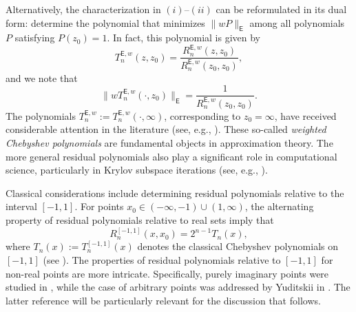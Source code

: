 \documentclass[12pt,oneside,reqno]{amsart}
\theoremstyle{definition}
\numberwithin{equation}{section}
\newcommand{\E}{{\mathsf E}}
\newcommand{\cP}{{\mathcal{P}}}
\begin{document}
Alternatively, the characterization in $(i)$--$(ii)$ can be reformulated in its dual form: determine the polynomial that minimizes $\|wP\|_{\E}$ among all polynomials $P$ satisfying $P(z_0) = 1$.
In fact, this polynomial is given by
\begin{equation}
	T_n^{\E,w}(z,z_0)=\frac{R_n^{\E,w}(z,z_0)}{R_n^{\E,w}(z_0,z_0)},
	\label{eq:chebyshev_residual_relation}
\end{equation}
and we note that
\begin{equation}
	\|wT_n^{\E,w}(\cdot,z_0)\|_{\E} = \frac{1}{R_n^{\E,w}(z_0,z_0)}.
	\label{eq:dual_relation}
\end{equation}
The polynomials $T_n^{\E,w}:=T_{n}^{\E,w}(\cdot,\infty)$, corresponding to $z_0=\infty$, have received considerable attention in the literature (see, e.g., \cite{lorentz86,smirnov-lebedev68,achieser56,christiansen-simon-zinchenko-I,novello-schiefermayr-zinchenko21}). These so-called \emph{weighted Chebyshev polynomials} are fundamental objects in approximation theory. The more general residual polynomials also play a significant role in computational science, particularly in Krylov subspace iterations (see, e.g., \cite{driscoll-toh-trefethen98, kuijlaars06, fischer96}). 

Classical considerations include determining residual polynomials relative to the interval \([-1,1]\). For points \(x_0 \in (-\infty, -1) \cup (1, \infty)\), the alternating property of residual polynomials relative to real sets imply that  
\[
R_n^{[-1,1]}(x, x_0) = 2^{n-1}T_n(x),
\]
where \(T_n(x) := T_n^{[-1,1]}(x)\) denotes the classical Chebyshev polynomials on $[-1,1]$ (see \cite{markoff16, christiansen-simon-zinchenko-V}). The properties of residual polynomials relative to \([-1,1]\) for non-real points are more intricate. Specifically, purely imaginary points were studied in \cite{freund88, freund-ruscheweyh}, while the case of arbitrary points was addressed by Yuditskii in \cite[Proposition 1]{yuditskii99}. The latter reference will be particularly relevant for the discussion that follows.
\end{document}
